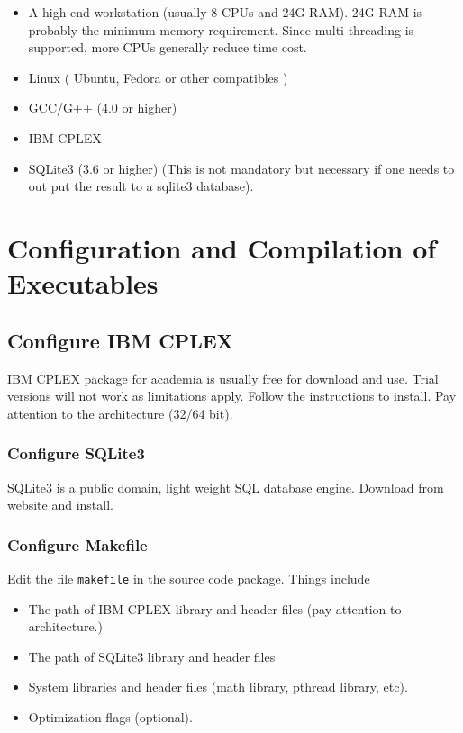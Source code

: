 \documentclass{article}
\begin{document}
\begin{itemize}

\item A high-end workstation (usually 8 CPUs and 
24G RAM). 24G RAM is probably the minimum memory 
requirement. Since multi-threading is supported, 
more CPUs generally reduce time cost.

\item Linux ( Ubuntu, Fedora or other compatibles )

\item GCC/G++ (4.0 or higher)

\item IBM CPLEX

\item SQLite3 (3.6 or higher) (This is not mandatory 
but necessary if one needs to out put the result to
a sqlite3 database).

\end{itemize}


\section{Configuration and Compilation of Executables}


\subsection{Configure IBM CPLEX}

IBM CPLEX package for academia is usually free for download 
and use. Trial versions will not work as limitations apply. 
Follow the instructions to install. Pay attention to the 
architecture (32/64 bit).


\subsubsection{Configure SQLite3}

SQLite3 is a public domain, light weight SQL database engine. 
Download from website and install.


\subsubsection{Configure Makefile}

Edit the file \texttt{makefile} in the source code package. 
Things include

\begin{itemize}

\item The path of IBM CPLEX library and header files 
(pay attention to architecture.)

\item The path of SQLite3 library and header files

\item System libraries and header files (math library, 
pthread library, etc).

\item Optimization flags (optional).

\end{itemize}
\end{document}
